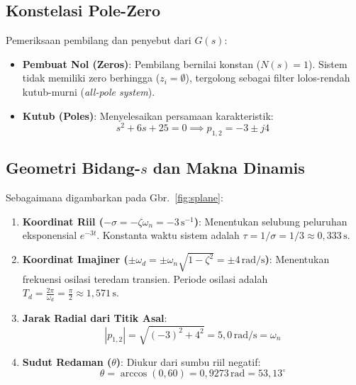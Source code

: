 \documentclass[journal]{IEEEtran}
\begin{document}
\subsection{Konstelasi Pole-Zero}
Pemeriksaan pembilang dan penyebut dari $G(s)$:
\begin{itemize}
    \item \textbf{Pembuat Nol (Zeros)}: Pembilang bernilai konstan ($N(s) = 1$). Sistem tidak memiliki zero berhingga ($z_i = \emptyset$), tergolong sebagai filter lolos-rendah kutub-murni (\textit{all-pole system}).
    \item \textbf{Kutub (Poles)}: Menyelesaikan persamaan karakteristik:
    \begin{equation}
        s^2 + 6s + 25 = 0 \implies p_{1,2} = -3 \pm j4
    \end{equation}
\end{itemize}

\subsection{Geometri Bidang-$s$ dan Makna Dinamis}
Sebagaimana digambarkan pada Gbr.~\ref{fig:splane}:
\begin{enumerate}
    \item \textbf{Koordinat Riil ($-\sigma = -\zeta \omega_n = -3\,\text{s}^{-1}$)}: Menentukan selubung peluruhan eksponensial $e^{-3t}$. Konstanta waktu sistem adalah $\tau = 1/\sigma = 1/3 \approx 0{,}333\,\text{s}$.
    \item \textbf{Koordinat Imajiner ($\pm \omega_d = \pm \omega_n \sqrt{1 - \zeta^2} = \pm 4\,\text{rad/s}$)}: Menentukan frekuensi osilasi teredam transien. Periode osilasi adalah $T_d = \frac{2\pi}{\omega_d} = \frac{\pi}{2} \approx 1{,}571\,\text{s}$.
    \item \textbf{Jarak Radial dari Titik Asal}:
    \begin{equation}
        |p_{1,2}| = \sqrt{(-3)^2 + 4^2} = 5{,}0\,\text{rad/s} = \omega_n
    \end{equation}
    \item \textbf{Sudut Redaman ($\theta$)}: Diukur dari sumbu riil negatif:
    \begin{equation}
        \theta = \arccos(0{,}60) = 0{,}9273\,\text{rad} = 53{,}13^\circ
    \end{equation}
\end{enumerate}
\end{document}
